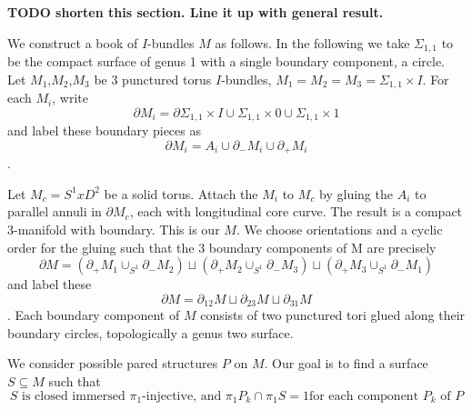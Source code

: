 \documentclass[12pt]{amsart}
\theoremstyle{definition}
\theoremstyle{remark}
\newcommand{\x}{\times}
\newcommand{\bd}{\partial}
\newcommand{\Si}{\Sigma}
\newcommand{\cin}{\subseteq}
\begin{document}
\textbf{ TODO shorten this section. Line it up with general result.}

We construct a book of $I$-bundles $M$ as follows. In the following we take
$\Si_{1,1}$ to be the compact surface of genus 1 with a single boundary
component, a circle. Let $M_1$,$M_2$,$M_3$ be 3 punctured torus $I$-bundles,
$M_1=M_2=M_3=\Si_{1,1}\x I$. For each $M_i$, write \[ \bd M_i = \bd \Si_{1,1}\x
I \cup \Si_{1,1}\x0 \cup \Si_{1,1} \x 1 \] and label these boundary pieces as
\[ \bd M_i = A_i \cup \bd_- M_i \cup \bd_+M_i \].

Let $M_c = S^1xD^2$ be a solid torus. Attach the $M_i$ to $M_c$ by gluing the
$A_i$ to parallel annuli in $\bd M_c$, each with longitudinal core curve. The
result is a compact 3-manifold with boundary. This is our $M$. We choose
orientations and a cyclic order for the gluing such that the 3 boundary
components of M are precisely
\[
\bd M = (\bd_+M_1 \cup_{S^1} \bd_-M_2) \sqcup (\bd_+M_2 \cup_{S^1} \bd_-M_3)
\sqcup (\bd_+M_3 \cup_{S^1} \bd_-M_1)
\]
and label these
\[
\bd M=\bd_{12}M \sqcup \bd_{23}M \sqcup \bd_{31}M
\].
Each boundary
component of $M$ consists of two punctured tori glued along their boundary
circles, topologically a genus two surface.

We consider possible pared structures $P$ on $M$. Our goal is to find
a surface $S \cin M$ such that
\begin{equation}\label{E:qf}
S \text{ is closed immersed $\pi_1$-injective, and  $\pi_1P_k \cap \pi_1S
= 1$
for each component $P_k$ of $P$} \tag{\textasteriskcentered}
\end{equation}

%
\end{document}
